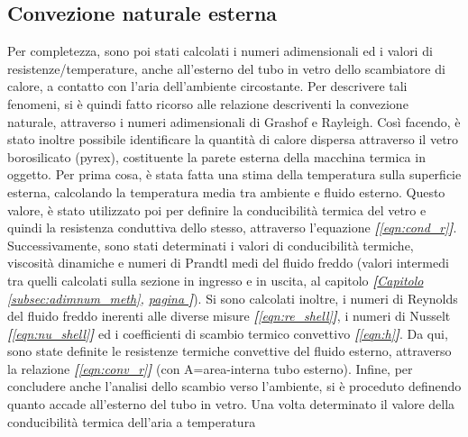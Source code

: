 \documentclass[a4paper,10pt]{article}                                                                                       %
\begin{document}
\subsection{Convezione naturale esterna}                                                                                    %
\label{subsec:extnat_conv}                                                                                                  %
  Per completezza, sono poi stati calcolati i numeri adimensionali ed i valori di resistenze/temperature, anche all'esterno
  del tubo in vetro dello scambiatore di calore, a contatto con l'aria dell'ambiente circostante. Per descrivere tali
  fenomeni, si è quindi fatto ricorso alle relazione descriventi la convezione naturale, attraverso i numeri adimensionali
  di Grashof e Rayleigh. Così facendo, è stato inoltre possibile identificare la quantità di calore dispersa attraverso il
  vetro borosilicato (pyrex), costituente la parete esterna della macchina termica in oggetto. Per prima cosa, è stata
  fatta una stima della temperatura sulla superficie esterna, calcolando la temperatura media tra ambiente e fluido
  esterno. Questo valore, è stato utilizzato poi per definire la conducibilità termica del vetro e quindi la resistenza
  conduttiva dello stesso, attraverso l'equazione \textit{\textbf{[}\ref{eqn:cond_r}\textbf{]}}. Successivamente, sono
  stati determinati i valori di conducibilità termiche, viscosità dinamiche e numeri di Prandtl medi del fluido freddo
  (valori intermedi tra quelli calcolati sulla sezione in ingresso e in uscita, al capitolo
  \textit{\textbf{[}\hyperref[subsec:adimnum_meth]{Capitolo }\ref{subsec:adimnum_meth},
  \hyperref[subsec:adimnum_meth]{pagina }\pageref{subsec:adimnum_meth}\textbf{]}}). Si sono calcolati inoltre, i numeri di
  Reynolds del fluido freddo inerenti alle diverse misure \textit{\textbf{[}\ref{eqn:re_shell}\textbf{]}}, i numeri di
  Nusselt \textit{\textbf{[}\ref{eqn:nu_shell}\textbf{]}} ed i coefficienti di scambio termico convettivo
  \textit{\textbf{[}\ref{eqn:h}\textbf{]}}. Da qui, sono state definite le resistenze termiche convettive del fluido
  esterno, attraverso la relazione \textit{\textbf{[}\ref{eqn:conv_r}\textbf{]}} (con A=area-interna tubo esterno).
  Infine, per concludere anche l'analisi dello scambio verso l'ambiente, si è proceduto definendo quanto accade
  all'esterno del tubo in vetro. Una volta determinato il valore della conducibilità termica dell'aria a temperatura
\end{document}
